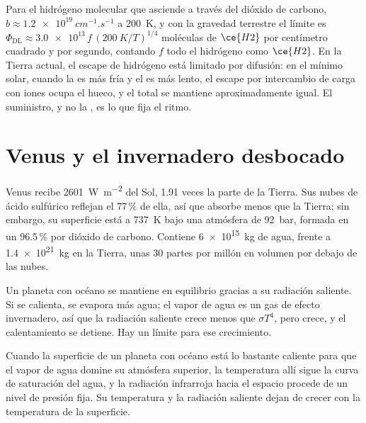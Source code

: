 Para el hidrógeno molecular que asciende a través del dióxido de carbono, $b \approx
\qty{1.2e19}{cm^{-1}.s^{-1}}$ a \qty{200}{K}, y con la gravedad
terrestre el límite es $\Phi_\mathrm{DL} \approx
\num{3.0e13}\,f\,(\qty{200}{K}/T)^{1/4}$ moléculas de $\ce{H2}$ por
centímetro cuadrado y por segundo, contando $f$ todo el hidrógeno como $\ce{H2}$. En
la Tierra actual, el escape de hidrógeno está limitado por difusión: en el
mínimo solar, cuando la  es más fría y el  es más lento, el escape por
intercambio de carga con iones ocupa el hueco, y el total se mantiene
aproximadamente igual. El suministro, y no la
, es lo que fija el ritmo.

\section{Venus y el invernadero desbocado}\label{sec:b3:planetary-atmospheres:venus}

Venus recibe \qty{2601}{W.m^{-2}} del Sol, 1.91 veces la
parte de la Tierra. Sus nubes de ácido sulfúrico reflejan el 77\,\% de ella, así que absorbe
menos que la Tierra; sin embargo, su superficie está a \qty{737}{K} bajo
una atmósfera de \qty{92}{bar}, formada en un 96.5\,\% por dióxido de carbono. Contiene \qty{6e15}{kg} de agua,
frente a \qty{1.4e21}{kg} en la Tierra, unas 30 partes por millón en
volumen por debajo de las nubes.

Un planeta con océano se mantiene en equilibrio gracias a su radiación saliente. Si
se calienta, se evapora más agua; el vapor de agua es un gas de efecto invernadero, así que la
radiación saliente crece menos que $\sigma T^4$, pero crece, y el
calentamiento se detiene. Hay un límite para ese crecimiento.

\begin{proposition}\label{prop:b3:planetary-atmospheres:limit}
Cuando la superficie de un planeta con océano está lo bastante caliente para que el vapor de agua
domine su atmósfera superior, la temperatura allí sigue la
curva de saturación del agua, y la radiación infrarroja hacia el espacio procede de
un nivel de presión fija. Su temperatura y la radiación saliente
dejan de crecer con la temperatura de la superficie.
\end{proposition}

